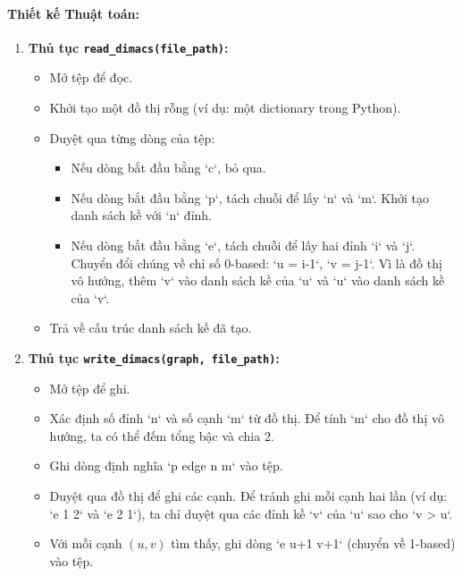 \documentclass[a4paper,12pt]{article}
\begin{document}
\paragraph{Thiết kế Thuật toán:}
\begin{enumerate}
    \item \textbf{Thủ tục \texttt{read\_dimacs(file\_path)}:}
        \begin{itemize}
            \item Mở tệp để đọc.
            \item Khởi tạo một đồ thị rỗng (ví dụ: một dictionary trong Python).
            \item Duyệt qua từng dòng của tệp:
                \begin{itemize}
                    \item Nếu dòng bắt đầu bằng `c`, bỏ qua.
                    \item Nếu dòng bắt đầu bằng `p`, tách chuỗi để lấy `n` và `m`. Khởi tạo danh sách kề với `n` đỉnh.
                    \item Nếu dòng bắt đầu bằng `e`, tách chuỗi để lấy hai đỉnh `i` và `j`. Chuyển đổi chúng về chỉ số 0-based: `u = i-1`, `v = j-1`. Vì là đồ thị vô hướng, thêm `v` vào danh sách kề của `u` và `u` vào danh sách kề của `v`.
                \end{itemize}
            \item Trả về cấu trúc danh sách kề đã tạo.
        \end{itemize}
    \item \textbf{Thủ tục \texttt{write\_dimacs(graph, file\_path)}:}
        \begin{itemize}
            \item Mở tệp để ghi.
            \item Xác định số đỉnh `n` và số cạnh `m` từ đồ thị. Để tính `m` cho đồ thị vô hướng, ta có thể đếm tổng bậc và chia 2.
            \item Ghi dòng định nghĩa `p edge n m` vào tệp.
            \item Duyệt qua đồ thị để ghi các cạnh. Để tránh ghi mỗi cạnh hai lần (ví dụ: `e 1 2` và `e 2 1`), ta chỉ duyệt qua các đỉnh kề `v` của `u` sao cho `v > u`.
            \item Với mỗi cạnh $(u, v)$ tìm thấy, ghi dòng `e u+1 v+1` (chuyển về 1-based) vào tệp.
        \end{itemize}
\end{enumerate}
\end{document}
